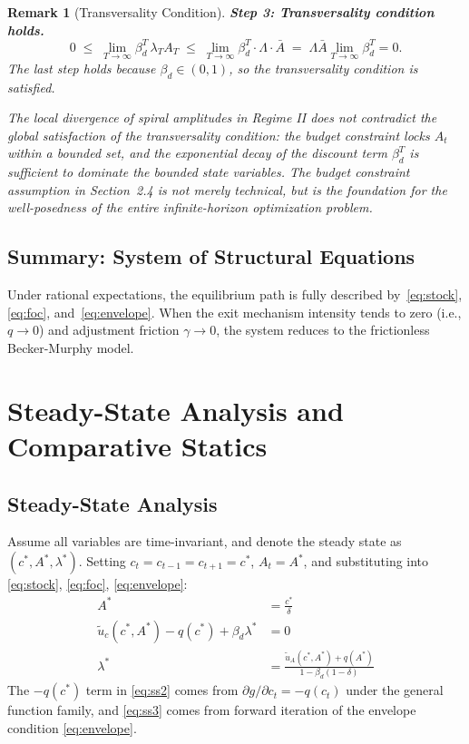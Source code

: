 \documentclass[12pt]{article}
\newtheorem{remark}{Remark}
\begin{document}
\begin{remark}[Transversality Condition]
    \medskip
    \noindent\textbf{Step 3: Transversality condition holds.}
    \[
        0 \;\leq\;
        \lim_{T\to\infty}\beta_d^T\,\lambda_T A_T
        \;\leq\;
        \lim_{T\to\infty}\beta_d^T\cdot\Lambda\cdot\bar{A}
        \;=\;
        \Lambda\bar{A}\lim_{T\to\infty}\beta_d^T = 0.
    \]
        The last step holds because $\beta_d\in(0,1)$, so the transversality condition is satisfied.
 
    \medskip
    The local divergence of spiral amplitudes in Regime II does not contradict the global satisfaction of the transversality condition:
    the budget constraint locks $A_t$ within a bounded set,
    and the exponential decay of the discount term $\beta_d^T$ is sufficient to dominate the bounded state variables.
    The budget constraint assumption in Section~2.4 is not merely technical,
    but is the foundation for the well-posedness of the entire infinite-horizon optimization problem.
\end{remark}

\subsection{Summary: System of Structural Equations}

Under rational expectations, the equilibrium path is fully described by~\eqref{eq:stock}, \eqref{eq:foc}, and~\eqref{eq:envelope}.
When the exit mechanism intensity tends to zero (i.e., $q \to 0$) and adjustment friction $\gamma \to 0$, the system reduces to the frictionless Becker-Murphy model.

\section{Steady-State Analysis and Comparative Statics}

 \subsection{Steady-State Analysis}
 
Assume all variables are time-invariant, and denote the steady state as $(c^*, A^*, \lambda^*)$.
Setting $c_t = c_{t-1} = c_{t+1} = c^*$, $A_t = A^*$, and substituting into
\eqref{eq:stock}, \eqref{eq:foc}, \eqref{eq:envelope}:
\begin{align}
    A^* &= \frac{c^*}{\delta}
    \label{eq:ss1} \\[4pt]
    \tilde{u}_c(c^*, A^*) - q(c^*) + \beta_d \lambda^* &= 0
    \label{eq:ss2} \\[4pt]
    \lambda^* &= \frac{\tilde{u}_A(c^*, A^*) + q(A^*)}{1 - \beta_d(1-\delta)}
    \label{eq:ss3}
\end{align}
The $-q(c^*)$ term in \eqref{eq:ss2} comes from $\partial g/\partial c_t = -q(c_t)$ under the general function family,
and \eqref{eq:ss3} comes from forward iteration of the envelope condition \eqref{eq:envelope}.
 
\end{document}
